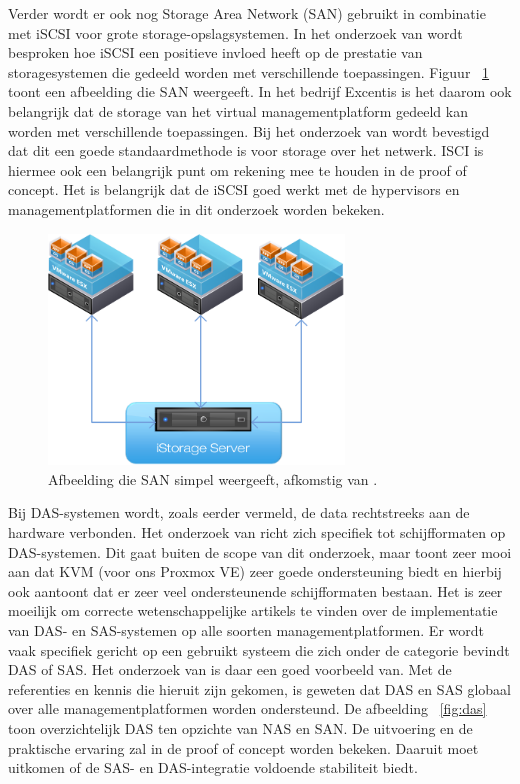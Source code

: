 \FloatBarrier
Verder wordt er ook nog Storage Area Network (SAN) gebruikt in combinatie met \newline iSCSI voor grote storage-opslagsystemen. In het onderzoek van \textcite{park2024performance} wordt besproken hoe iSCSI een positieve invloed heeft op de prestatie van storagesystemen die gedeeld worden met verschillende toepassingen.
Figuur ~\ref{fig:san} toont een afbeelding die SAN weergeeft.
In het bedrijf Excentis is het daarom ook belangrijk dat de storage van het virtual managementplatform gedeeld kan worden met verschillende toepassingen. Bij het onderzoek van \textcite{park2024performance} wordt bevestigd dat dit een goede standaardmethode is voor storage over het netwerk.
ISCI is hiermee ook een belangrijk punt om rekening mee te houden in de proof of concept. Het is belangrijk dat de iSCSI goed werkt met de hypervisors en managementplatformen die in dit onderzoek worden bekeken.

\begin{figure}[h!]
  \centering
  \includegraphics[width=0.7\textwidth]{../onderzoek/nas-isci.png} 
  \caption{Afbeelding die SAN simpel weergeeft, afkomstig van \textcite{kernsafeVMware}.}
  \label{fig:san}
\end{figure}


\FloatBarrier
Bij DAS-systemen wordt, zoals eerder vermeld, de data rechtstreeks aan de hardware verbonden. Het onderzoek van \textcite{joshi2014empirical} richt zich specifiek tot schijfformaten op DAS-systemen.
Dit gaat buiten de scope van dit onderzoek, maar toont zeer mooi aan dat KVM (voor ons Proxmox VE) zeer goede ondersteuning biedt en hierbij ook aantoont dat er zeer veel ondersteunende schijfformaten bestaan.
Het is zeer moeilijk om correcte wetenschappelijke artikels te vinden over de implementatie van DAS- en SAS-systemen op alle soorten managementplatformen.
Er wordt vaak specifiek gericht op een gebruikt systeem die zich onder de categorie bevindt DAS of SAS. Het onderzoek van \textcite{joshi2014empirical} is daar een goed voorbeeld van.
Met de referenties en kennis die hieruit zijn gekomen, is geweten dat DAS en SAS globaal over alle managementplatformen worden ondersteund. De afbeelding ~\ref{fig:das} toon overzichtelijk DAS ten opzichte van NAS en SAN.
De uitvoering en de praktische ervaring zal in de proof of concept worden bekeken. Daaruit moet uitkomen of de SAS- en DAS-integratie voldoende stabiliteit biedt.

